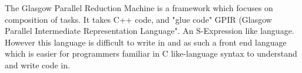 The Glasgow Parallel Reduction Machine is a framework which focuses
on composition of tasks. It takes C++ code, and "glue code" GPIR (Glasgow
Parallel Intermediate Representation Language". An S-Expression like
language. However this language is difficult to write in and as such
a front end language which is easier for programmers familiar in
C like-language syntax to understand and write code in. 

